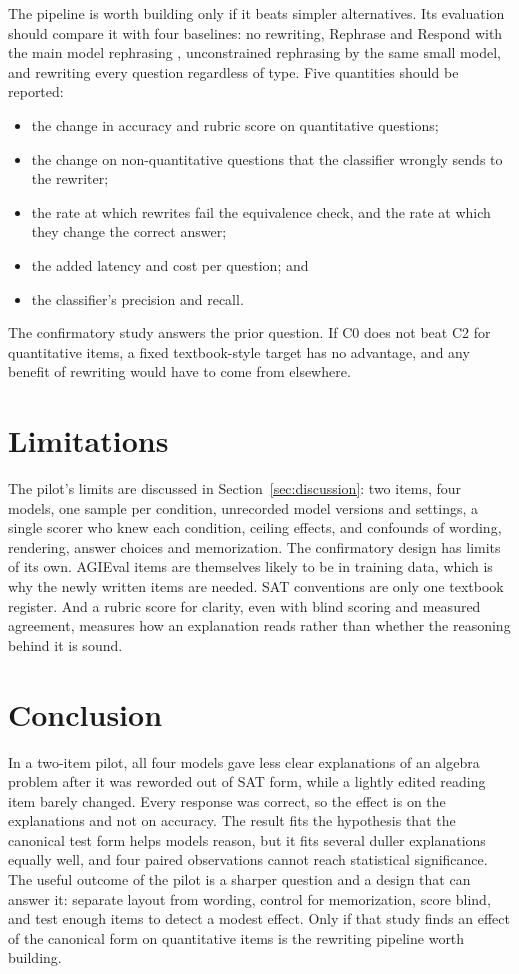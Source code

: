 \documentclass[11pt]{article}
\begin{document}
The pipeline is worth building only if it beats simpler alternatives. Its evaluation should compare it with four baselines: no rewriting, Rephrase and Respond with the main model rephrasing \citep{deng2023rephrase}, unconstrained rephrasing by the same small model, and rewriting every question regardless of type. Five quantities should be reported:
\begin{itemize}
  \item the change in accuracy and rubric score on quantitative questions;
  \item the change on non-quantitative questions that the classifier wrongly sends to the rewriter;
  \item the rate at which rewrites fail the equivalence check, and the rate at which they change the correct answer;
  \item the added latency and cost per question; and
  \item the classifier's precision and recall.
\end{itemize}
The confirmatory study answers the prior question. If C0 does not beat C2 for quantitative items, a fixed textbook-style target has no advantage, and any benefit of rewriting would have to come from elsewhere.

\section{Limitations}
The pilot's limits are discussed in Section~\ref{sec:discussion}: two items, four models, one sample per condition, unrecorded model versions and settings, a single scorer who knew each condition, ceiling effects, and confounds of wording, rendering, answer choices and memorization. The confirmatory design has limits of its own. AGIEval items are themselves likely to be in training data, which is why the newly written items are needed. SAT conventions are only one textbook register. And a rubric score for clarity, even with blind scoring and measured agreement, measures how an explanation reads rather than whether the reasoning behind it is sound.

\section{Conclusion}
In a two-item pilot, all four models gave less clear explanations of an algebra problem after it was reworded out of SAT form, while a lightly edited reading item barely changed. Every response was correct, so the effect is on the explanations and not on accuracy. The result fits the hypothesis that the canonical test form helps models reason, but it fits several duller explanations equally well, and four paired observations cannot reach statistical significance. The useful outcome of the pilot is a sharper question and a design that can answer it: separate layout from wording, control for memorization, score blind, and test enough items to detect a modest effect. Only if that study finds an effect of the canonical form on quantitative items is the rewriting pipeline worth building.
\end{document}
